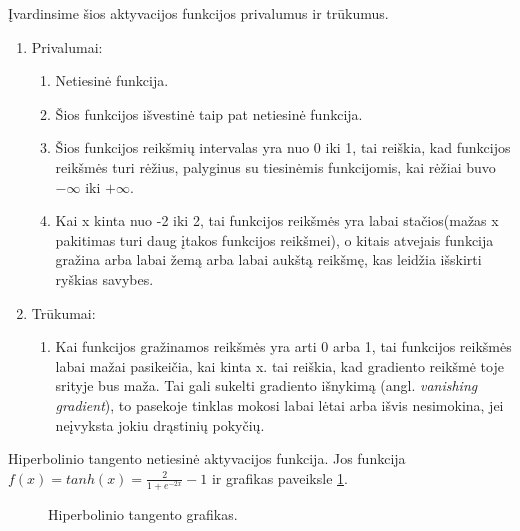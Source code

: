 Įvardinsime šios aktyvacijos funkcijos privalumus ir trūkumus. \cite{Avinash2017}
\begin{enumerate}
  \item Privalumai:
  \begin{enumerate}
    \item Netiesinė funkcija.
    \item Šios funkcijos išvestinė taip pat netiesinė funkcija.
    \item Šios funkcijos reikšmių intervalas yra nuo 0 iki 1, tai reiškia, kad funkcijos reikšmės turi rėžius, palyginus su tiesinėmis funkcijomis, kai rėžiai buvo $-\infty$ iki $+\infty$.
    \item Kai x kinta nuo -2 iki 2, tai funkcijos reikšmės yra labai stačios(mažas x pakitimas turi daug įtakos funkcijos reikšmei), o kitais atvejais funkcija gražina arba labai žemą arba labai aukštą reikšmę, kas leidžia išskirti ryškias savybes.
  \end{enumerate}
  \item Trūkumai:
  \begin{enumerate}
    \item Kai funkcijos gražinamos reikšmės yra arti 0 arba 1, tai funkcijos reikšmės labai mažai pasikeičia, kai kinta x. tai reiškia, kad gradiento reikšmė toje srityje bus maža. Tai gali sukelti gradiento išnykimą (angl. \textit{vanishing gradient}), to pasekoje tinklas mokosi labai lėtai arba išvis nesimokina, jei neįvyksta jokiu drąstinių pokyčių.
  \end{enumerate}
\end{enumerate}


Hiperbolinio tangento netiesinė aktyvacijos funkcija. Jos funkcija $f(x)=tanh(x)=\frac{2}{1+e^{-2x}}-1$ ir grafikas paveiksle \ref{fig:tanh}.

\begin{figure}[h!]
  \centering
{}
\caption{Hiperbolinio tangento grafikas.}
\label{fig:tanh}
\end{figure}

